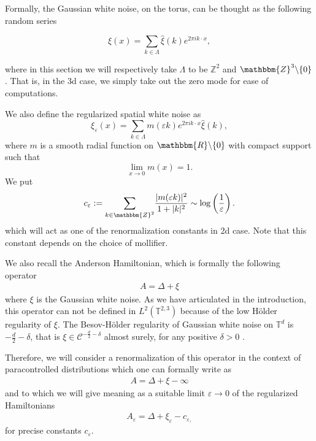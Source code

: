 \documentclass[11pt, oneside]{article}   	%
\newcommand{\assign}{:=}
\begin{document}
Formally, the Gaussian white noise, on the torus, can be thought as the following random series

\[
\xi(x)=\sum_{k\in \Lambda}\hat{\xi}(k)e^{2\pi i k\cdot x},
\]

where in this section we will respectively take $\Lambda$ to be  $\mathbb{Z}^2$ and $\mathbbm{Z}^3 \backslash \{ 0 \}$.  That is, in the 3d case, we simply take out the zero mode for ease of computations.

We also define the regularized spatial white
noise as
\begin{equation} \label{eqn:xieps}
\xi_{\varepsilon} (x) = \sum_{k \in \Lambda} m (\varepsilon 
k ) e^{2\pi i k \cdot x} \hat{\xi} (k), \end{equation}
where $m$ is a smooth radial function on $\mathbbm{R} \backslash \{ 0 \}$ with
compact support such that 
\[\underset{}{}_{\underset{}{}} \underset{x \rightarrow 0}{\lim} m (x) = 1.\]
We put
\[ c_{\varepsilon} \assign \underset{k \in \mathbbm{Z}^2}{\sum} \frac{|
	m (\varepsilon  k ) |^2}{1 + | k |^2} \sim \log \left(
\frac{1}{\varepsilon} \right). \]
which will act as one of the renormalization constants in 2d case.  Note that this constant depends on the choice of mollifier. 

We also recall  the Anderson Hamiltonian, which is formally the following operator
\begin{align}
A  = \Delta  + \xi  \end{align}
where $\xi$ is the Gaussian white noise. As we have articulated in the introduction, this operator can not be defined in $L^2(\mathbb{T}^{2,3})$ because of the low H\"older regularity of $\xi$.  The Besov-H\"older regularity of Gaussian white noise on $\mathbb{T}^d$ is $-\frac{d}{2} - \delta$, that is $\xi \in \mathscr{C}^{-\frac{d}{2} - \delta}$ almost surely, for any positive $\delta>0$ \cite{gubinelli2015paracontrolled}.

Therefore, we will consider a renormalization of this operator in the context of paracontrolled distributions which one can formally write as
\begin{align}
A  = \Delta  + \xi - \infty  \end{align}
and to which we will give meaning as a suitable  limit $\varepsilon \rightarrow 0$ of the regularized
Hamiltonians
\begin{align}
A_{\varepsilon} = \Delta + \xi_{\varepsilon} - c_{\varepsilon,} \label{eqn:2dHepsdef} \end{align}
for precise constants $c_{\varepsilon} $.
\end{document}
